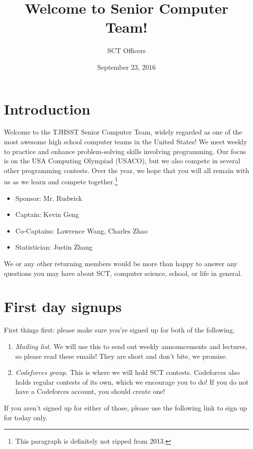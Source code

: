 \documentclass{article}
\title{Welcome to Senior Computer Team!}
\author{SCT Officers}
\date{September 23, 2016}
\begin{document}
\maketitle

\section{Introduction}

Welcome to the TJHSST Senior Computer Team, widely regarded as one of the most awesome high school computer teams in the United States! We meet weekly to practice and enhance problem-solving skills involving programming. Our focus is on the USA Computing Olympiad (USACO), but we also compete in several other programming contests. Over the year, we hope that you will all remain with us as we learn
and compete together.\footnote{This paragraph is definitely not ripped from 2013.}

\begin{itemize}
	\item Sponsor: Mr. Rudwick
	\item Captain: Kevin Geng
	\item Co-Captains: Lawrence Wang, Charles Zhao
	\item Statistician: Justin Zhang
\end{itemize}

We or any other returning members would be more than happy to answer any questions you may have about SCT, computer science, school, or life in general.


\section{First day signups}

First things first: please make sure you're signed up for both of the following.

\begin{enumerate}
    \item \textit{Mailing list.} We will use this to send out weekly announcements and lectures, so please read these emails! They are short and don't bite, we promise.
    \item \textit{Codeforces group.} This is where we will hold SCT contests. Codeforces also holds regular contests of its own, which we encourage you to do! If you do not have a Codeforces account, you should create one!
\end{enumerate}

If you aren't signed up for either of those, please use the following link to sign up for today only.
\end{document}
